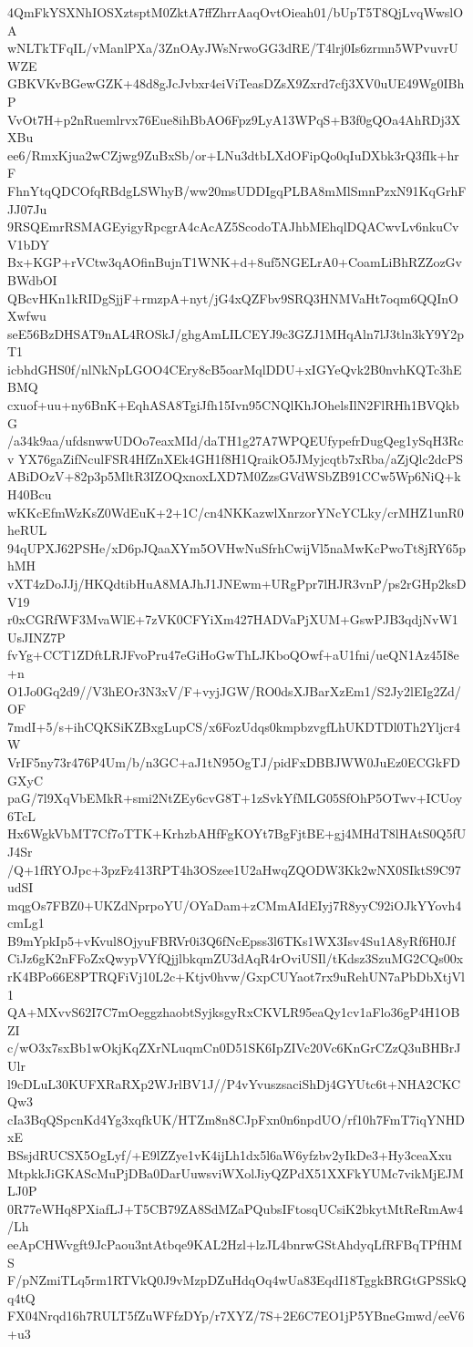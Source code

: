 4QmFkYSXNhIOSXztsptM0ZktA7ffZhrrAaqOvtOieah01/bUpT5T8QjLvqWwslOA
wNLTkTFqIL/vManlPXa/3ZnOAyJWsNrwoGG3dRE/T4lrj0Is6zrmn5WPvuvrUWZE
GBKVKvBGewGZK+48d8gJcJvbxr4eiViTeasDZsX9Zxrd7cfj3XV0uUE49Wg0IBhP
VvOt7H+p2nRuemlrvx76Eue8ihBbAO6Fpz9LyA13WPqS+B3f0gQOa4AhRDj3XXBu
ee6/RmxKjua2wCZjwg9ZuBxSb/or+LNu3dtbLXdOFipQo0qIuDXbk3rQ3fIk+hrF
FhnYtqQDCOfqRBdgLSWhyB/ww20msUDDIgqPLBA8mMlSmnPzxN91KqGrhFJJ07Ju
9RSQEmrRSMAGEyigyRpcgrA4cAcAZ5ScodoTAJhbMEhqlDQACwvLv6nkuCvV1bDY
Bx+KGP+rVCtw3qAOfinBujnT1WNK+d+8uf5NGELrA0+CoamLiBhRZZozGvBWdbOI
QBcvHKn1kRIDgSjjF+rmzpA+nyt/jG4xQZFbv9SRQ3HNMVaHt7oqm6QQInOXwfwu
seE56BzDHSAT9nAL4ROSkJ/ghgAmLILCEYJ9c3GZJ1MHqAln7lJ3tln3kY9Y2pT1
icbhdGHS0f/nlNkNpLGOO4CEry8cB5oarMqlDDU+xIGYeQvk2B0nvhKQTc3hEBMQ
cxuof+uu+ny6BnK+EqhASA8TgiJfh15Ivn95CNQlKhJOhelsIlN2FlRHh1BVQkbG
/a34k9aa/ufdsnwwUDOo7eaxMId/daTH1g27A7WPQEUfypefrDugQeg1ySqH3Rcv
YX76gaZifNculFSR4HfZnXEk4GH1f8H1QraikO5JMyjcqtb7xRba/aZjQlc2dcPS
ABiDOzV+82p3p5MltR3IZOQxnoxLXD7M0ZzsGVdWSbZB91CCw5Wp6NiQ+kH40Bcu
wKKcEfmWzKsZ0WdEuK+2+1C/cn4NKKazwlXnrzorYNcYCLky/crMHZ1unR0heRUL
94qUPXJ62PSHe/xD6pJQaaXYm5OVHwNuSfrhCwijVl5naMwKcPwoTt8jRY65phMH
vXT4zDoJJj/HKQdtibHuA8MAJhJ1JNEwm+URgPpr7lHJR3vnP/ps2rGHp2ksDV19
r0xCGRfWF3MvaWlE+7zVK0CFYiXm427HADVaPjXUM+GswPJB3qdjNvW1UsJINZ7P
fvYg+CCT1ZDftLRJFvoPru47eGiHoGwThLJKboQOwf+aU1fni/ueQN1Az45I8e+n
O1Jo0Gq2d9//V3hEOr3N3xV/F+vyjJGW/RO0dsXJBarXzEm1/S2Jy2lEIg2Zd/OF
7mdI+5/s+ihCQKSiKZBxgLupCS/x6FozUdqs0kmpbzvgfLhUKDTDl0Th2Yljcr4W
VrIF5ny73r476P4Um/b/n3GC+aJ1tN95OgTJ/pidFxDBBJWW0JuEz0ECGkFDGXyC
paG/7l9XqVbEMkR+smi2NtZEy6cvG8T+1zSvkYfMLG05SfOhP5OTwv+ICUoy6TcL
Hx6WgkVbMT7Cf7oTTK+KrhzbAHfFgKOYt7BgFjtBE+gj4MHdT8lHAtS0Q5fUJ4Sr
/Q+1fRYOJpc+3pzFz413RPT4h3OSzee1U2aHwqZQODW3Kk2wNX0SIktS9C97udSI
mqgOs7FBZ0+UKZdNprpoYU/OYaDam+zCMmAIdEIyj7R8yyC92iOJkYYovh4cmLg1
B9mYpkIp5+vKvul8OjyuFBRVr0i3Q6fNcEpss3l6TKs1WX3Isv4Su1A8yRf6H0Jf
CiJz6gK2nFFoZxQwypVYfQjjlbkqmZU3dAqR4rOviUSIl/tKdsz3SzuMG2CQs00x
rK4BPo66E8PTRQFiVj10L2c+Ktjv0hvw/GxpCUYaot7rx9uRehUN7aPbDbXtjVl1
QA+MXvvS62I7C7mOeggzhaobtSyjksgyRxCKVLR95eaQy1cv1aFlo36gP4H1OBZI
c/wO3x7sxBb1wOkjKqZXrNLuqmCn0D51SK6IpZIVc20Vc6KnGrCZzQ3uBHBrJUlr
l9cDLuL30KUFXRaRXp2WJrlBV1J//P4vYvuszsaciShDj4GYUtc6t+NHA2CKCQw3
cIa3BqQSpcnKd4Yg3xqfkUK/HTZm8n8CJpFxn0n6npdUO/rf10h7FmT7iqYNHDxE
BSsjdRUCSX5OgLyf/+E9lZZye1vK4ijLh1dx5l6aW6yfzbv2yIkDe3+Hy3ceaXxu
MtpkkJiGKAScMuPjDBa0DarUuwsviWXolJiyQZPdX51XXFkYUMc7vikMjEJMLJ0P
0R77eWHq8PXiafLJ+T5CB79ZA8SdMZaPQubsIFtosqUCsiK2bkytMtReRmAw4/Lh
eeApCHWvgft9JcPaou3ntAtbqe9KAL2Hzl+lzJL4bnrwGStAhdyqLfRFBqTPfHMS
F/pNZmiTLq5rm1RTVkQ0J9vMzpDZuHdqOq4wUa83EqdI18TggkBRGtGPSSkQq4tQ
FX04Nrqd16h7RULT5fZuWFfzDYp/r7XYZ/7S+2E6C7EO1jP5YBneGmwd/eeV6+u3
